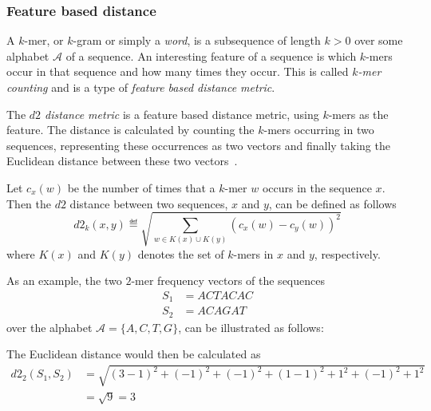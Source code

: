 \subsubsection{Feature based distance}

A $k$-mer, or $k$-gram or simply a \emph{word}, is a subsequence of length
$k>0$ over some alphabet $\mathcal{A}$ of a sequence. An interesting feature of
a sequence is which $k$-mers occur in that sequence and how many times they
occur. This is called \emph{$k$-mer counting} and is a type of \emph{feature
based distance metric}.

The \emph{$d2$ distance metric} is a feature based distance metric, using
$k$-mers as the feature. The distance is calculated by counting the $k$-mers
occurring in two sequences, representing these occurrences as two vectors and
finally taking the Euclidean distance between these two
vectors~\cite[pp.~53-54]{dong}.

Let $c_x(w)$ be the number of times that a $k$-mer $w$ occurs in the sequence
$x$. Then the $d2$ distance between two sequences, $x$ and $y$, can be defined
as follows~\cite[pp.~1-2]{hazelhurst}
\begin{equation}
  d2_k(x,y) \eqdef \sqrt{\sum_{w \in K(x) \cup K(y)} (c_x(w) - c_y(w))^2}
\end{equation}
where $K(x)$ and $K(y)$ denotes the set of $k$-mers in $x$ and $y$,
respectively.

As an example, the two $2$-mer frequency vectors of the sequences
\begin{align*}
  S_1 &= ACTACAC \\
  S_2 &= ACAGAT
\end{align*}
over the alphabet $\mathcal{A} = \{A,C,T,G\}$, can be illustrated as follows:

\begin{table}[!h]
\centering
{}
\end{table}

The Euclidean distance would then be calculated as
\begin{align*}
  d2_2(S_1, S_2)
    &= \sqrt{(3-1)^2 + (-1)^2 + (-1)^2 + (1-1)^2 + 1^2 + (-1)^2 + 1^2} \\
    &= \sqrt{9} = 3
\end{align*}

